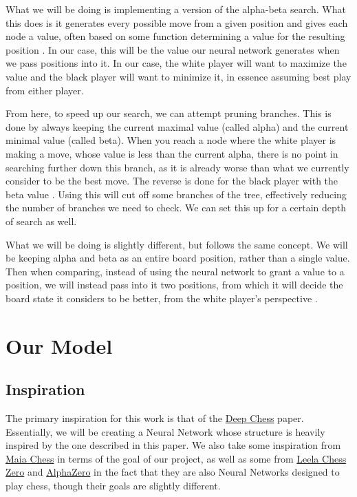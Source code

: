 \documentclass[12pt]{article}
\begin{document}
    What we will be doing is implementing a version of the alpha-beta search. What this does is it generates every possible move from a given position and gives each node a value, often based on some function determining a value for the resulting position \cite{alphabeta_montecarlo}. In our case, this will be the value our neural network generates when we pass positions into it. In our case, the white player will want to maximize the value and the black player will want to minimize it, in essence assuming best play from either player. 

    From here, to speed up our search, we can attempt pruning branches. This is done by always keeping the current maximal value (called alpha) and the current minimal value (called beta). When you reach a node where the white player is making a move, whose value is less than the current alpha, there is no point in searching further down this branch, as it is already worse than what we currently consider to be the best move. The reverse is done for the black player with the beta value \cite{deepchess}\cite{alphabeta_montecarlo}. Using this will cut off some branches of the tree, effectively reducing the number of branches we need to check. We can set this up for a certain depth of search as well.

    What we will be doing is slightly different, but follows the same concept. We will be keeping alpha and beta as an entire board position, rather than a single value. Then when comparing, instead of using the neural network to grant a value to a position, we will instead pass into it two positions, from which it will decide the board state it considers to be better, from the white player's perspective \cite{deepchess}.
    
    \section{Our Model}

    \subsection{Inspiration}

    The primary inspiration for this work is that of the \href{http://dx.doi.org/10.1007/978-3-319-44781-0_11}{Deep Chess} paper. Essentially, we will be creating a Neural Network whose structure is heavily inspired by the one described in this paper. We also take some inspiration from \href{https://doi.org/10.1145/3394486.3403219}{Maia Chess} in terms of the goal of our project, as well as some from \href{https://github.com/LeelaChessZero/lc0}{Leela Chess Zero} and \href{https://arxiv.org/abs/1712.01815}{AlphaZero} in the fact that they are also Neural Networks designed to play chess, though their goals are slightly different. 
\end{document}
